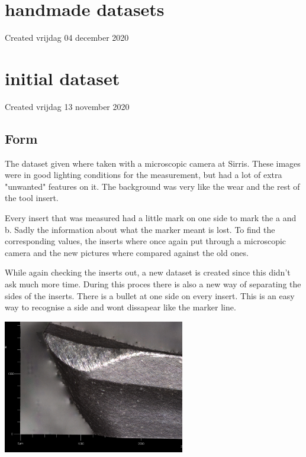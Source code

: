 		\section{handmade datasets}

Created vrijdag 04 december 2020




		\section{initial dataset}

Created vrijdag 13 november 2020



\subsection{Form}

The dataset given where taken with a microscopic camera at Sirris. These images were in good lighting conditions for the measurement, but had a lot of extra "unwanted" features on it. The background was very like the wear and the rest of the tool insert. 

Every insert that was measured had a little mark on one side to mark the a and b. Sadly the information about what the marker meant is lost. To find the corresponding values, the inserts where once again put through a microscopic camera and the new pictures where compared against the old ones. 



While again checking the inserts out, a new dataset is created since this didn't ask much more time. During this proces there is also a new way of separating the sides of the inserts. There is a bullet at one side on every insert. This is an easy way to recognise a side and wont dissapear like the marker line. 







\includegraphics[width=3.125000in, keepaspectratio=true]{./fig/Vision/Dataset/handmade_datasets/initial_dataset/initial dataset pictuer.PNG}




